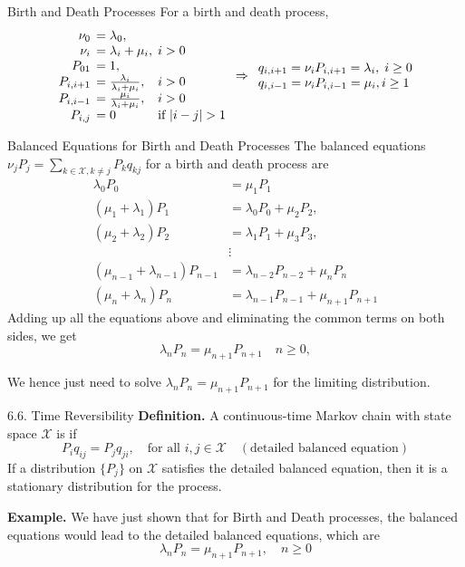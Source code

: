 \documentclass[letterpaper,handout]{beamer}
\def\X{\mathcal{X}}
\begin{document}
\begin{frame}{Birth and Death Processes}
For a birth and death process,
$$
\begin{array}{r@{\;\,}l@{\;\,}ll}
\nu_0 &= \lambda_0,\\
\nu_i &= \lambda_i + \mu_i,& i>0\\
P_{01} &= 1,\\
P_{i,i+1} &= \frac{\lambda_i}{\lambda_i +\mu_i}, &i>0\\
P_{i,i-1} &= \frac{    \mu_i}{\lambda_i +\mu_i}, &i>0\\
P_{i,j}&=0 &\mbox{if }|i-j|>1
\end{array}\Rightarrow
\begin{array}{l}
q_{i,i+1} =\nu_iP_{i,i+1}=\lambda_i,\; i\ge 0\\
q_{i,i-1} =\nu_iP_{i,i-1}=\mu_i, i\ge 1
\end{array}
$$
\end{frame}
\begin{frame}{Balanced Equations for Birth and Death Processes}
The balanced equations $\nu_jP_j= \sum_{k\in\X,k\neq j}P_k q_{kj}$ for
a birth and death process are
\begin{align*}
\lambda_0 P_0 &= \mu_1  P_1\\
(\mu_1+\lambda_1) P_1&=\lambda_0 P_{0}+\mu_2 P_{2},\\
(\mu_2+\lambda_2) P_2&=\lambda_1 P_{1}+\mu_3 P_{3},\\
&\vdots\\
(\mu_{n-1}+\lambda_{n-1}) P_{n-1}&=\lambda_{n-2} P_{n-2}+\mu_n P_n\\
(\mu_n+\lambda_n) P_n&=\lambda_{n-1} P_{n-1}+\mu_{n+1} P_{n+1}
\end{align*}
Adding up all the equations above and eliminating the common terms on both sides, we get
$$\lambda_n P_n= \mu_{n+1}P_{n+1}\quad n\ge 0,$$

We hence just need to solve $\lambda_n P_n= \mu_{n+1}P_{n+1}$ for the limiting distribution.
\end{frame}
\begin{frame}{6.6. Time Reversibility}
\textbf{Definition.} A continuous-time Markov chain with state space $\X$ is  if
$$
P_iq_{ij} = P_j q_{ji},\quad\mbox{for all }i, j\in\X\quad(\mbox{detailed balanced equation})
$$
If a distribution $\{P_j\}$ on $\X$ satisfies the detailed balanced equation, then it is a stationary distribution for the process.\par\bigskip

\textbf{Example.} We have just shown that for Birth and Death processes,
the balanced equations would lead to the detailed balanced equations, which are
$$\lambda_n P_n= \mu_{n+1}P_{n+1},\quad n \ge 0$$
\end{frame}
\end{document}
